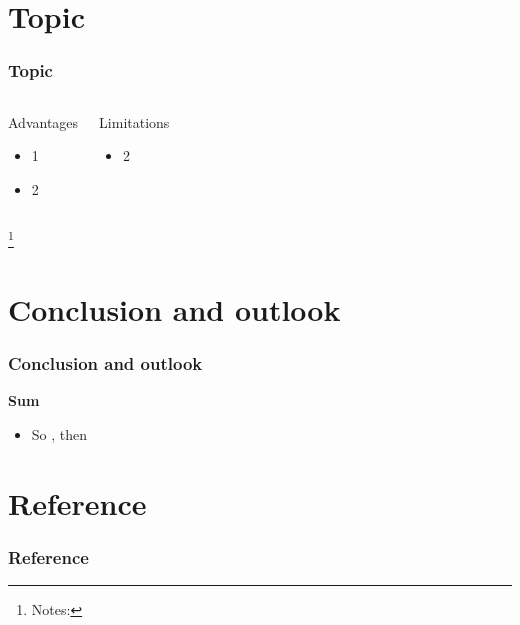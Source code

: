 \documentclass[hyperref={bookmarks=false},aspectratio=169]{beamer}
\newcommand{\cmark}{\textcolor{blue}{\ding{51}}}%
\newcommand{\xmark}{\textcolor{red}{\ding{55}}}%
\newcommand\blfootnote[1]{%
  \begingroup
  \renewcommand\thefootnote{}%
  \footnote{#1}%
  \endgroup
}
\begin{document}
\section{Topic}
\begin{frame}
  \frametitle{Topic}
  \begin{columns}[t]       %
        \begin{center}
          \begin{minipage}{1\textwidth} 
            \begin{block}{Advantages}
            \begin{itemize}
              \item 1
              \item 2
            \end{itemize}
          \end{block}
          \end{minipage}
        \end{center}
        \begin{center}
          \begin{minipage}{1\textwidth} 
            \begin{alertblock}{Limitations}
            \begin{itemize}
              \item 2
            \end{itemize}
          \end{alertblock}
          \end{minipage}
        \end{center}
  \end{columns}  
  \blfootnote{\tiny Notes:}  
\end{frame}
\section{Conclusion and outlook}
\begin{frame}  
\frametitle{Conclusion and outlook}
\textbf{Sum}
\begin{itemize}
  \item So \cmark, then \xmark
\end{itemize}
\end{frame}
\section{Reference}
\begin{frame}[allowframebreaks]  
  \frametitle{Reference}
  \setlength{\itemsep}{0.5em}  
  \printbibliography[title=References]  %
\end{frame}
\end{document}
